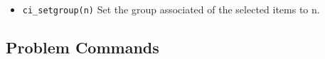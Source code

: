 \begin{itemize}
Meshed with elements that span at most \texttt{maxsegdeg} degrees
per element

Boundary property \texttt{"propname"}

\texttt{hide}: 0 = not hidden in post-processor, 1 == hidden in post
processor

A member of group number \texttt{group}

A member of the conductor specified by the string
\texttt{"inconductor".} If the segment is not part of a conductor,
this parameter can be specified as
\texttt{"<None>"}.

\item{\tt ci\_setgroup(n)} Set the group associated of the selected items to n.
\end{itemize}

\subsection{Problem Commands}

